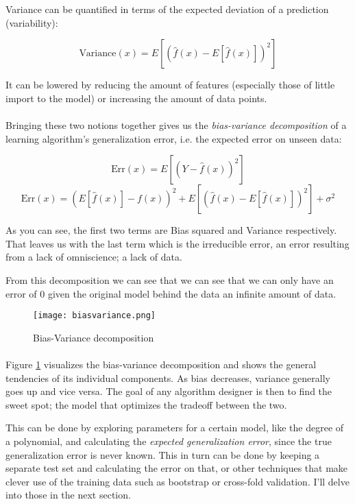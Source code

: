 Variance can be quantified in terms of
the expected deviation of a prediction (variability):

$$
\text{Variance}(x) = E[ (\hat{f}(x) - E[\hat{f}(x)])^2]
$$

It can be lowered by
reducing the amount of features
(especially those of little import to the model)
or increasing the amount of data points.

\paragraph{}
Bringing these two notions together
gives us the \textit{bias-variance decomposition}
of a learning algorithm's generalization error,
i.e. the expected error on unseen data:

$$
\text{Err}(x) = E[(Y - \hat{f}(x))^2]
$$
$$
\text{Err}(x) = (E[\hat{f} (x)] - f(x))^2 + E[ (\hat{f}(x) - E[\hat{f}(x)])^2] + \sigma^2
$$

As you can see, the first two terms
are Bias squared and Variance respectively.
That leaves us with the last term
which is the irreducible error,
an error resulting from a lack of
omniscience; a lack of data.

From this decomposition we can see that we
can see that we can only have an error of 0
given the original model behind the data
an infinite amount of data. %

\begin{figure}[ht]
\center
\texttt{[image: biasvariance.png]}

\caption{Bias-Variance decomposition}
\label{fig:biasvariance}
\end{figure}

\paragraph{}
Figure \ref{fig:biasvariance}
visualizes the bias-variance decomposition
and shows the general tendencies of its individual components.
As bias decreases, variance generally goes up
and vice versa.
The goal of any algorithm designer
is then to find the sweet spot;
the model that optimizes the tradeoff
between the two.

This can be done by exploring parameters
for a certain model,
like the degree of a polynomial,
and calculating the
\textit{expected generalization error}, %
since the true generalization error
is never known.
This in turn can be done
by keeping a separate test set
and calculating the error on that,
or other techniques that make clever use
of the training data
such as bootstrap or cross-fold validation.
I'll delve into those in the next section.

